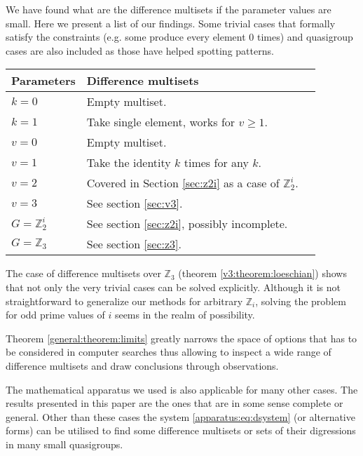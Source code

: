 We have found what are the difference multisets if the parameter values are small. Here we present a list of our findings. Some trivial cases that formally satisfy the constraints (e.g. some produce every element 0 times) and quasigroup cases are also included as those have helped spotting patterns.

\begin{tabular}{llr}
\toprule
    Parameters & Difference multisets \\
\midrule
    $k = 0$ & Empty multiset. \\
    $k = 1$ & Take single element, works for $v \geq 1$. \\
    $v = 0$ & Empty multiset. \\
    $v = 1$ & Take the identity $k$ times for any $k$. \\
    $v = 2$ & Covered in Section \ref{sec:z2i} as a case of $\mathbb Z_2^i$. \\
    $v = 3$ & See section \ref{sec:v3}. \\
    $G=\mathbb Z_2^i$ & See section \ref{sec:z2i}, possibly incomplete. \\
    $G=\mathbb Z_3$ & See section \ref{sec:z3}. \\
\bottomrule
\end{tabular}


The case of difference multisets over $\mathbb Z_3$ (theorem \ref{v3:theorem:loeschian}) shows that not only the very trivial cases can be solved explicitly. Although it is not straightforward to generalize our methods for arbitrary $\mathbb Z_i$, solving the problem for odd prime values of $i$ seems in the realm of possibility.

Theorem \ref{general:theorem:limits} greatly narrows the space of options that has to be considered in computer searches thus allowing to inspect a wide range of difference multisets and draw conclusions through observations.

The mathematical apparatus we used is also applicable for many other cases. The results presented in this paper are the ones that are in some sense complete or general. Other than these cases the system \eqref{apparatus:eq:dsystem} (or alternative forms) can be utilised to find some difference multisets or sets of their digressions in many small quasigroups. 

